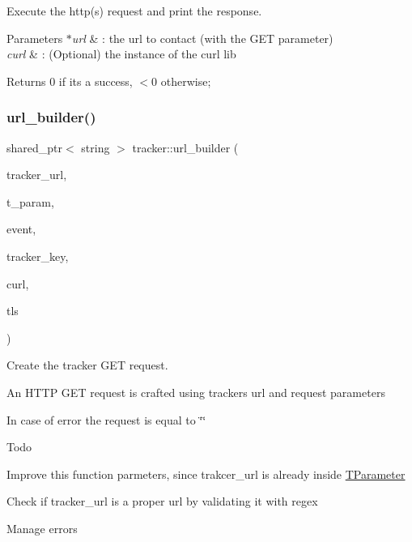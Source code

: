 Execute the http(s) request and print the response. 


\begin{DoxyParams}{Parameters}
{\em $\ast$url} & \+: the url to contact (with the G\+ET parameter) \\
\hline
{\em curl} & \+: (Optional) the instance of the curl lib\\
\hline
\end{DoxyParams}
\begin{DoxyReturn}{Returns}
0 if it\textquotesingle{}s a success, $<$0 otherwise; 
\end{DoxyReturn}
\mbox{\label{namespacetracker_a60c22f265981fba0a5dad14d6d3d516a}} 
\subsubsection{\texorpdfstring{url\+\_\+builder()}{url\_builder()}}
{\footnotesize\ttfamily shared\+\_\+ptr$<$ string $>$ tracker\+::url\+\_\+builder (\begin{DoxyParamCaption}\item[{const string \&}]{tracker\+\_\+url,  }\item[{const \hyperlink{structtracker_1_1TParameter}{T\+Parameter} \&}]{t\+\_\+param,  }\item[{event\+\_\+type}]{event,  }\item[{const string \&}]{tracker\+\_\+key,  }\item[{C\+U\+RL $\ast$}]{curl,  }\item[{bool}]{tls }\end{DoxyParamCaption})}



Create the tracker G\+ET request. 

An H\+T\+TP G\+ET request is crafted using tracker\textquotesingle{}s url and request parameters

In case of error the request is equal to \char`\"{}\char`\"{}

\begin{DoxyRefDesc}{Todo}
\item[\hyperlink{todo__todo000003}{Todo}]Improve this function parmeters, since trakcer\+\_\+url is already inside \hyperlink{structtracker_1_1TParameter}{T\+Parameter} 

Check if tracker\+\_\+url is a proper url by validating it with regex 

Manage errors\end{DoxyRefDesc}



